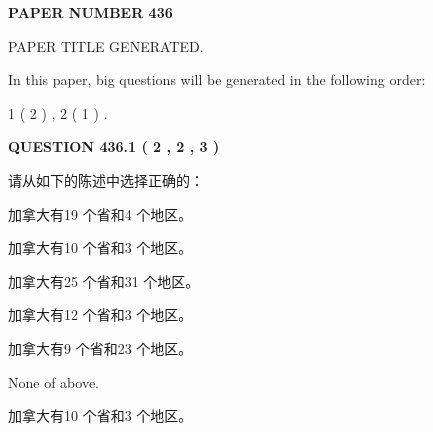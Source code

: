 \documentclass{ctexart}
\begin{document}
   
   
   
\newpage 
\setcounter{page}{ 
   436001 } 
   
   
   
   
 {\textbf{ \Large{ PAPER NUMBER  436  }}}
   
   
\vspace{0.2in}
   
   
   
   
   
   
   
   
 \vspace{0.2in}
 
 
 
 
   
   
 PAPER TITLE GENERATED.
   
   
   
\vspace{0.2in}
   
In this paper, big questions will be generated in the following order: 
   
   
   1 ( 2 )
 ,
   2 ( 1 )
 .
  
\vspace{0.2in}
  
{\textbf{\Large{QUESTION
436.1 
 ( 2 , 2 , 3 )
}}}
  
  
请从如下的陈述中选择正确的：
 
 
加拿大有19 个省和4 个地区。
 
 
加拿大有10 个省和3 个地区。
 
 
加拿大有25 个省和31 个地区。
 
 
加拿大有12 个省和3 个地区。
 
 
加拿大有9 个省和23 个地区。
 
 
 None of above.
 
 
\noindent{}
 
 
加拿大有10 个省和3 个地区。
 
 
\noindent{}
 
 
   
   
   
\end{document}
